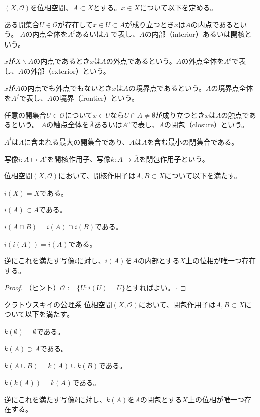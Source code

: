 \documentclass[../root.tex]{subfiles}
\begin{document}
\begin{Def}{}{}
$ ( X, \mathcal{O} ) $を位相空間、$ A\subset X $とする。$ x\in X $について以下を定める。
\begin{EnumCond}
\item ある開集合$ U\in\mathcal{O} $が存在して$ x\in U\subset A $が成り立つとき$ x $は$ A $の内点であるという。
$ A $の内点全体を$ A^{i} $あるいは$ A^{\circ} $で表し、$ A $の内部（interior）あるいは開核という。
\item $ x $が$ X\backslash A $の内点であるとき$ x $は$ A $の外点であるという。$ A $の外点全体を$ A^{e} $で表し、$ A $の外部（exterior）という。
\item $ x $が$ A $の内点でも外点でもないとき$ x $は$ A $の境界点であるという。$ A $の境界点全体を$ A^{f} $で表し、$ A $の境界（frontier）という。
\item 任意の開集合$ U\in\mathcal{O} $について$ x\in U $なら$ U\cap A\neq\emptyset $が成り立つとき$ x $は$ A $の触点であるという。
$ A $の触点全体を$ \overline{A} $あるいは$ A^{a} $で表し、$ A $の閉包（closure）という。
\end{EnumCond}
\end{Def}

$ A^{i} $は$ A $に含まれる最大の開集合であり、$ \overline{A} $は$ A $を含む最小の閉集合である。

写像$ i\colon A\mapsto A^{i} $を開核作用子、写像$ k\colon A\mapsto\overline{A} $を閉包作用子という。

\begin{Exc}{}{}
位相空間$ ( X, \mathcal{O} ) $において、開核作用子は$ A, B\subset X $について以下を満たす。
\begin{EnumCond}
\item $ i( X )=X $である。
\item $ i( A )\subset A $である。
\item $ i( A\cap B )=i( A )\cap i( B ) $である。
\item $ i( i( A ) )=i( A ) $である。
\end{EnumCond}

逆にこれを満たす写像$ i $に対し、$ i( A ) $を$ A $の内部とする$ X $上の位相が唯一つ存在する。
\end{Exc}

\begin{proof}
（ヒント）$ \mathcal{O}:=\lbrace U : i( U )=U \rbrace $とすればよい。$ \square $
\end{proof}

\begin{Exc}{クラトウスキイの公理系}{}
位相空間$ ( X, \mathcal{O} ) $において、閉包作用子は$ A, B\subset X $について以下を満たす。
\begin{EnumCond}
\item $ k( \emptyset )=\emptyset $である。
\item $ k( A )\supset A $である。
\item $ k( A\cup B )=k( A )\cup k( B ) $である。
\item $ k( k( A ) )=k( A ) $である。
\end{EnumCond}

逆にこれを満たす写像$ k $に対し、$ k( A ) $を$ A $の閉包とする$ X $上の位相が唯一つ存在する。
\end{Exc}
\end{document}
